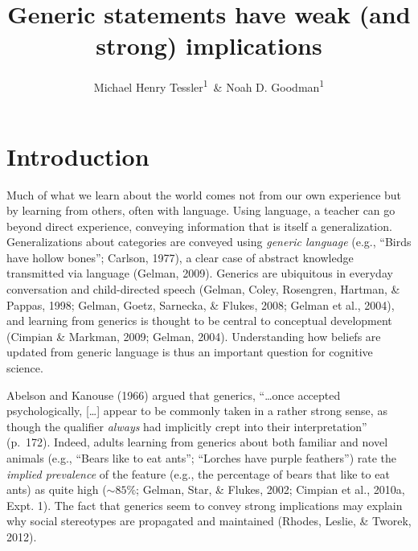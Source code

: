 \documentclass[,man,floatsintext]{apa6}
\title{Generic statements have weak (and strong) implications}
\author{Michael Henry Tessler\textsuperscript{1}~\& Noah D.
Goodman\textsuperscript{1}}
\date{}
\affiliation{
\vspace{0.5cm}
\textsuperscript{1} Department of Psychology, Stanford University}
\theoremstyle{definition}
\theoremstyle{definition}
\theoremstyle{definition}
\theoremstyle{remark}
\begin{document}
\maketitle

\newcommand{\denote}[1]{\mbox{ $[\![ #1 ]\!]$}}
\newcommand*\diff{\mathop{}\!\mathrm{d}}

\newcommand{\mht}[1]{{\textcolor{Blue}{[mht: #1]}}}
\newcommand{\ndg}[1]{{\textcolor{Green}{[ndg: #1]}}}
\newcommand{\red}[1]{{\textcolor{Red}{#1}}}

\hypertarget{introduction}{%
\section{Introduction}\label{introduction}}

Much of what we learn about the world comes not from our own experience
but by learning from others, often with language. Using language, a
teacher can go beyond direct experience, conveying information that is
itself a generalization. Generalizations about categories are conveyed
using \emph{generic language} (e.g., ``Birds have hollow bones'';
Carlson, 1977), a clear case of abstract knowledge transmitted via
language (Gelman, 2009). Generics are ubiquitous in everyday
conversation and child-directed speech (Gelman, Coley, Rosengren,
Hartman, \& Pappas, 1998; Gelman, Goetz, Sarnecka, \& Flukes, 2008;
Gelman et al., 2004), and learning from generics is thought to be
central to conceptual development (Cimpian \& Markman, 2009; Gelman,
2004). Understanding how beliefs are updated from generic language is
thus an important question for cognitive science.

Abelson and Kanouse (1966) argued that generics, \enquote{\ldots{}once
accepted psychologically, {[}\ldots{}{]} appear to be commonly taken in
a rather strong sense, as though the qualifier \emph{always} had
implicitly crept into their interpretation} (p.~172). Indeed, adults
learning from generics about both familiar and novel animals (e.g.,
\enquote{Bears like to eat ants}; \enquote{Lorches have purple
feathers}) rate the \emph{implied prevalence} of the feature (e.g., the
percentage of bears that like to eat ants) as quite high (\(\sim 85\%\);
Gelman, Star, \& Flukes, 2002; Cimpian et al., 2010a, Expt. 1). The fact
that generics seem to convey strong implications may explain why social
stereotypes are propagated and maintained (Rhodes, Leslie, \& Tworek,
2012).
\end{document}
